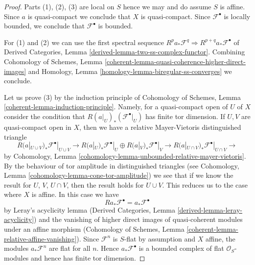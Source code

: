 \begin{proof}
Parts (1), (2), (3) are local on $S$ hence we may and do assume $S$
is affine. Since $a$ is quasi-compact we conclude that $X$ is quasi-compact.
Since $\mathcal{F}^\bullet$ is locally bounded, we conclude that
$\mathcal{F}^\bullet$ is bounded.

\medskip\noindent
For (1) and (2) we can use the first spectral sequence
$R^pa_*\mathcal{F}^q \Rightarrow R^{p + q}a_*\mathcal{F}^\bullet$ of
Derived Categories, Lemma \ref{derived-lemma-two-ss-complex-functor}.
Combining Cohomology of Schemes, Lemma
\ref{coherent-lemma-quasi-coherence-higher-direct-images}
and Homology, Lemma \ref{homology-lemma-biregular-ss-converges}
we conclude.

\medskip\noindent
Let us prove (3) by the induction principle of
Cohomology of Schemes, Lemma \ref{coherent-lemma-induction-principle}.
Namely, for a quasi-compact open of $U$ of $X$ consider the
condition that $R(a|_U)_*(\mathcal{F}^\bullet|_U)$ has
finite tor dimension. If $U, V$ are quasi-compact open in
$X$, then we have a relative Mayer-Vietoris distinguished triangle
$$
R(a|_{U \cup V})_*\mathcal{F}^\bullet|_{U \cup V} \to
R(a|_U)_*\mathcal{F}^\bullet|_U \oplus
R(a|_V)_*\mathcal{F}^\bullet|_V \to
R(a|_{U \cap V})_*\mathcal{F}^\bullet|_{U \cap V} \to
$$
by Cohomology, Lemma \ref{cohomology-lemma-unbounded-relative-mayer-vietoris}.
By the behaviour of tor amplitude in distinguished triangles
(see Cohomology, Lemma \ref{cohomology-lemma-cone-tor-amplitude})
we see that if we know the result for $U$, $V$, $U \cap V$, then
the result holds for $U \cup V$. This reduces us to the case where
$X$ is affine. In this case we have
$$
Ra_*\mathcal{F}^\bullet = a_*\mathcal{F}^\bullet
$$
by Leray's acyclicity lemma
(Derived Categories, Lemma \ref{derived-lemma-leray-acyclicity})
and the vanishing of higher direct images of quasi-coherent modules
under an affine morphism
(Cohomology of Schemes, Lemma \ref{coherent-lemma-relative-affine-vanishing}).
Since $\mathcal{F}^n$ is $S$-flat by assumption and $X$ affine, the modules
$a_*\mathcal{F}^n$ are flat for all $n$. Hence $a_*\mathcal{F}^\bullet$
is a bounded complex of flat $\mathcal{O}_S$-modules and hence has
finite tor dimension.


\end{proof}
